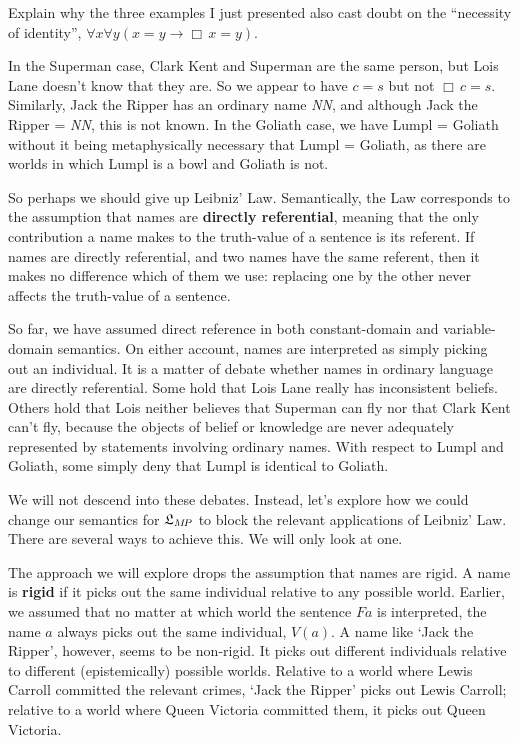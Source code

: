 \begin{exercise}
  Explain why the three examples I just presented also cast doubt on the
  ``necessity of identity'', $\forall x\forall y(x\!=\!y \to \Box\, x\!=\!y)$.
\end{exercise}
\begin{solution}
  In the Superman case, Clark Kent and Superman are the same person, but Lois
  Lane doesn't know that they are. So we appear to have $c\!=\!s$ but not
  $\Box\, c\!=\!s$. Similarly, Jack the Ripper has an ordinary name \emph{NN},
  and although Jack the Ripper = \emph{NN}, this is not known. In the
  Goliath case, we have Lumpl = Goliath without it being metaphysically
  necessary that Lumpl = Goliath, as there are worlds in which Lumpl is a bowl
  and Goliath is not.
\end{solution}

So perhaps we should give up Leibniz' Law. Semantically, the Law corresponds to
the assumption that names are \textbf{directly referential}, meaning that the
only contribution a name makes to the truth-value of a sentence is its referent.
If names are directly referential, and two names have the same referent, then it
makes no difference which of them we use: replacing one by the other never
affects the truth-value of a sentence.

So far, we have assumed direct reference in both constant-domain and
variable-domain semantics. On either account, names are interpreted as simply
picking out an individual. It is a matter of debate whether names in ordinary
language are directly referential. Some hold that Lois Lane really has
inconsistent beliefs. Others hold that Lois neither believes that Superman can
fly nor that Clark Kent can't fly, because the objects of belief or knowledge
are never adequately represented by statements involving ordinary names. With
respect to Lumpl and Goliath, some simply deny that Lumpl is identical to
Goliath.

We will not descend into these debates. Instead, let's explore how we could
change our semantics for $\mathfrak{L}_{M\!P}$ to block the relevant applications of
Leibniz' Law. There are several ways to achieve this. We will only look at one.

The approach we will explore drops the assumption that names are rigid. A name
is \textbf{rigid} if it picks out the same individual relative to any possible
world. Earlier, we assumed that no matter at which world the sentence $Fa$ is
interpreted, the name $a$ always picks out the same individual, $V(a)$. A name
like `Jack the Ripper', however, seems to be non-rigid. It picks out different
individuals relative to different (epistemically) possible worlds. Relative to a
world where Lewis Carroll committed the relevant crimes, `Jack the Ripper' picks
out Lewis Carroll; relative to a world where Queen Victoria committed them, it
picks out Queen Victoria.

